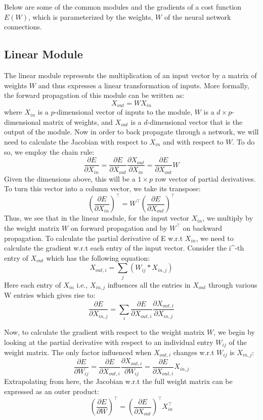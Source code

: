 Below are some of the common modules and the gradients of a cost function $E(W)$, which is parameterized by the weights, $W$ of the neural network connections.

\subsection{Linear Module}

The linear module represents the multiplication of an input vector by a matrix of weights $W$ and thus expresses a linear transformation of inputs.
More formally, the forward propagation of this module can be written as: $$X_{out} = WX_{in}$$ where $X_{in}$ is a $p$-dimensional vector of inputs to the module, $W$ is a $d \times p$-dimensional matrix of weights, and $X_{out}$ is a $d$-dimensional vector that is the output of the module.
Now in order to back propagate through a network, we will need to calculate the Jacobian with respect to $X_{in}$ and with respect to $W$.
To do so, we employ the chain rule: $$\frac{\partial E}{\partial X_{in}} = \frac{\partial E}{\partial X_{out}}\frac{\partial X_{out}}{\partial X_{in}} = \frac{\partial E}{\partial X_{out}}W$$ Given the dimensions above, this will be a $1 \times p$ row vector of partial derivatives. To turn this vector into a column vector, we take its transpose: $$\left(\frac{\partial E}{\partial X_{in}}\right)^\top = W^\top \left(\frac{\partial E}{\partial X_{out}}\right)^\top$$ Thus, we see that in the linear module, for the input vector $X_{in}$, we multiply by the weight matrix $W$ on forward propagation and by $W^\top$ on backward propagation.
To calculate the partial derivative of E w.r.t $X_{in}$, we need to calculate the gradient w.r.t each entry of the input vector. Consider the i^{-th} entry of $X_{out}$ which has the following equation:
$$X_{out,i} = \sum_{j}(W_{ij} * X_{in,j})$$ Here each entry of $X_{in}$ i.e., $X_{in,j}$ influences all the entries in $X_{out}$ through various W entries which gives rise to: $$\frac{\partial E}{\partial X_{in, j}} = \sum_{i}\frac{\partial E}{\partial X_{out,i}} \frac{\partial X_{out,i}}{\partial X_{in,j}} $$

Now, to calculate the gradient with respect to the weight matrix $W$, we begin by looking at the partial derivative with respect to an individual entry $W_{ij}$ of the weight matrix. The only factor influenced when $X_{out,i}$ changes w.r.t $W_{ij}$ is $X_{in,j}$:  $$\frac{\partial E}{\partial W_{ij}} = \frac{\partial E}{\partial X_{out, i}}\frac{\partial X_{out, i}}{\partial W_{ij}} = \frac{\partial E}{\partial X_{out, i}}X_{in, j}$$ Extrapolating from here, the Jacobian w.r.t the full weight matrix can be expressed as an outer product: $$\left(\frac{\partial E}{\partial W}\right)^\top = \left(\frac{\partial E}{\partial X_{out}}\right)^\top X_{in}^\top$$

